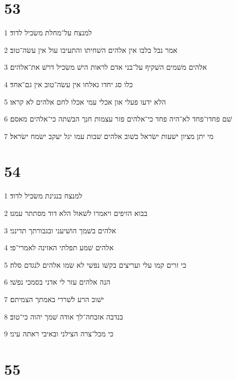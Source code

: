 \chapter{53}

\par 1 למנצח על־מחלת משׂכיל לדוד׃
\par 2 אמר נבל בלבו אין אלהים השׁחיתו והתעיבו עול אין עשׂה־טוב׃
\par 3 אלהים משׁמים השׁקיף על־בני אדם לראות הישׁ משׂכיל דרשׁ את־אלהים׃
\par 4 כלו סג יחדו נאלחו אין עשׂה־טוב אין גם־אחד׃
\par 5 הלא ידעו פעלי און אכלי עמי אכלו לחם אלהים לא קראו׃
\par 6 שׁם פחדו־פחד לא־היה פחד כי־אלהים פזר עצמות חנך הבשׁתה כי־אלהים מאסם׃
\par 7 מי יתן מציון ישׁעות ישׂראל בשׁוב אלהים שׁבות עמו יגל יעקב ישׂמח ישׂראל׃

\chapter{54}

\par 1 למנצח בנגינת משׂכיל לדוד׃
\par 2 בבוא הזיפים ויאמרו לשׁאול הלא דוד מסתתר עמנו׃
\par 3 אלהים בשׁמך הושׁיעני ובגבורתך תדינני׃
\par 4 אלהים שׁמע תפלתי האזינה לאמרי־פי׃
\par 5 כי זרים קמו עלי ועריצים בקשׁו נפשׁי לא שׂמו אלהים לנגדם סלה׃
\par 6 הנה אלהים עזר לי אדני בסמכי נפשׁי׃
\par 7 ישׁוב הרע לשׁררי באמתך הצמיתם׃
\par 8 בנדבה אזבחה־לך אודה שׁמך יהוה כי־טוב׃
\par 9 כי מכל־צרה הצילני ובאיבי ראתה עיני׃

\chapter{55}

